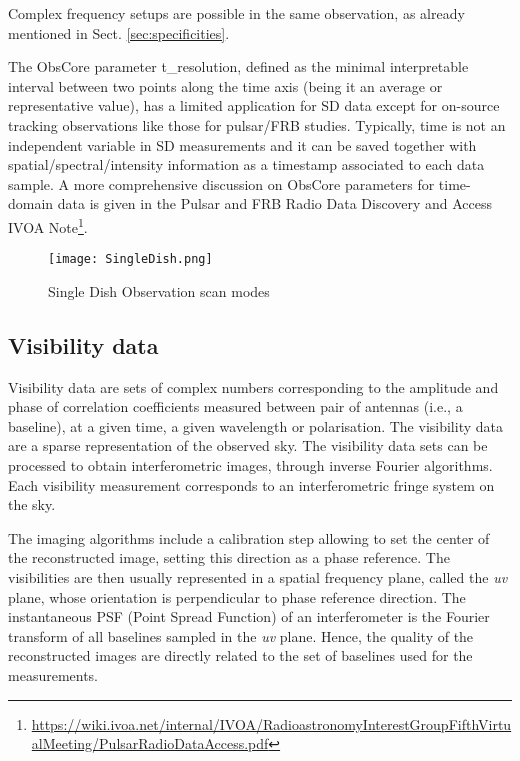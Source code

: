 \documentclass[11pt,a4paper]{ivoa}
\begin{document}
Complex frequency setups are possible in the same observation, as already mentioned in Sect. \ref{sec:specificities}.

The ObsCore parameter t\_resolution, defined as the minimal interpretable interval between two points along the
time axis (being it an average or representative value), has a limited application for SD data except for on-source tracking
observations like those for pulsar/FRB studies.
Typically, time is not an independent variable in SD measurements and it can be saved together with spatial/spectral/intensity
information as a timestamp associated to each data sample.
A more comprehensive discussion on ObsCore parameters for time-domain data is given in the Pulsar
and FRB Radio Data Discovery and Access IVOA Note\footnote{\url{https://wiki.ivoa.net/internal/IVOA/RadioastronomyInterestGroupFifthVirtualMeeting/PulsarRadioDataAccess.pdf}}.




\begin{figure}[H]
\centering

\texttt{[image: SingleDish.png]}
\caption{Single Dish Observation scan modes}
\label{fig:SD}
\end{figure}



\subsection{Visibility data }
\label{sec:visibility}

Visibility data are sets of complex numbers corresponding to the amplitude and phase
of correlation coefficients measured between pair of antennas (i.e., a baseline), at
a given time, a given wavelength or polarisation. The visibility data are a sparse
representation of the observed sky. The visibility data sets can be processed to obtain
interferometric images, through inverse Fourier algorithms. Each visibility measurement
corresponds to an interferometric fringe system on the sky.

The imaging algorithms include a calibration step allowing to set the center of the
reconstructed image, setting this direction as a phase reference. The visibilities
are then usually represented in a spatial frequency plane, called the \emph{uv} plane,
whose orientation is perpendicular to phase reference direction. The instantaneous PSF
(Point Spread Function) of an interferometer is the Fourier transform of all baselines
sampled in the \emph{uv} plane. Hence, the quality of the reconstructed images are
directly related to the set of baselines used for the measurements.
\end{document}
